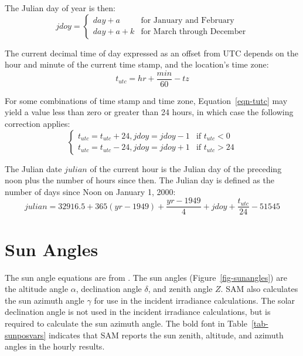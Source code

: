 \documentclass[12pt,letterpaper]{article}
\begin{document}
The Julian day of year is then:
\begin{equation}
\mathit{jdoy}= 
\left\{
   \begin{array}{ll}
      \mathit{day} + a & \text{for January and February}\\
      \mathit{day} + a + k & \text{for March through December}
   \end{array}
\right. 
\end{equation}

The current decimal time of day expressed as an offset from UTC depends on the hour and minute of the current time stamp, and the location's time zone:
\begin{equation}\label{eqn-tutc}
t_{utc} = \mathit{hr} + \frac{\mathit{min}}{60} - \mathit{tz}
\end{equation}

For some combinations of time stamp and time zone, Equation~\ref{eqn-tutc} may yield a value less than zero or greater than 24 hours, in which case the following correction applies:
\begin{equation}
\left\{
   \begin{array}{ll}
      t_{utc} = t_{utc} + 24, \mathit{jdoy} = \mathit{jdoy} - 1 & 
      \text{if $t_{utc}<0$}\\
      t_{utc} = t_{utc} - 24,  \mathit{jdoy} = \mathit{jdoy} + 1 & 
      \text{if $t_{utc}>24$}
   \end{array}
\right. 
\end{equation}

The Julian date $\mathit{julian}$ of the current hour is the Julian day of the preceding noon plus the number of hours since then. The Julian day is defined as the number of days since Noon on January 1, 2000:
\begin{equation}\label{eqn-jday}
\mathit{julian} = 32916.5 + 365(\mathit{yr}-1949) + \frac{\mathit{yr}-1949}{4} + \mathit{jdoy} + \frac{t_{utc}}{24} - 51545
\end{equation}

\section{Sun Angles} \label{sec-sunangles}

The sun angle equations are from \citet{michalsky1988}. The sun angles (Figure~\ref{fig-sunangles}) are the altitude angle $\alpha$, declination angle $\delta$, and zenith angle $Z$. SAM also calculates the sun azimuth angle $\gamma$ for use in the incident irradiance calculations. The solar declination angle is not used in the incident irradiance calculations, but is required to calculate the sun azimuth angle. The bold font in Table~\ref{tab-sunposvars} indicates that SAM reports the sun zenith, altitude, and azimuth angles in the hourly results.
\end{document}
